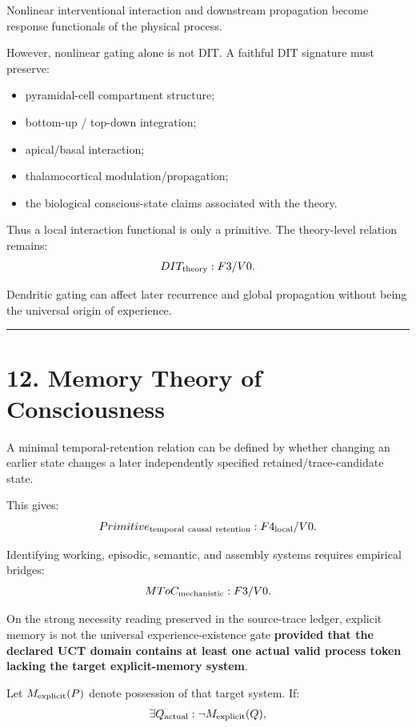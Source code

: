 \documentclass[
  11pt,
  a4paper,
]{article}
\providecommand{\tightlist}{%
  \setlength{\itemsep}{0pt}\setlength{\parskip}{0pt}}
\begin{document}
Nonlinear interventional interaction and downstream propagation become
response functionals of the physical process.

However, nonlinear gating alone is not DIT. A faithful DIT signature
must preserve:

\begin{itemize}
\tightlist
\item
  pyramidal-cell compartment structure;
\item
  bottom-up / top-down integration;
\item
  apical/basal interaction;
\item
  thalamocortical modulation/propagation;
\item
  the biological conscious-state claims associated with the theory.
\end{itemize}

Thus a local interaction functional is only a primitive. The
theory-level relation remains:
\nopagebreak[4]
\[
DIT_{\rm theory}:F3/V0.
\]

Dendritic gating can affect later recurrence and global propagation
without being the universal origin of experience.

\begin{center}\rule{0.5\linewidth}{0.5pt}\end{center}

\hypertarget{memory-theory-of-consciousness}{%
\section{12. Memory Theory of
Consciousness}\label{memory-theory-of-consciousness}}

A minimal temporal-retention relation can be defined by whether changing
an earlier state changes a later independently specified
retained/trace-candidate state.

This gives:
\nopagebreak[4]
\[
Primitive_{\rm temporal\ causal\ retention}:F4_{\rm local}/V0.
\]

Identifying working, episodic, semantic, and assembly systems requires
empirical bridges:
\nopagebreak[4]
\[
MToC_{\rm mechanistic}:F3/V0.
\]

On the strong necessity reading preserved in the source-trace ledger,
explicit memory is not the universal experience-existence gate
\textbf{provided that the declared UCT domain contains at least one
actual valid process token lacking the target explicit-memory system}.

Let \(M_{\rm explicit}(P)\) denote possession of that target system. If:
\nopagebreak[4]
\[
\exists Q_{\rm actual}:
\neg M_{\rm explicit}(Q),
\]
\end{document}
